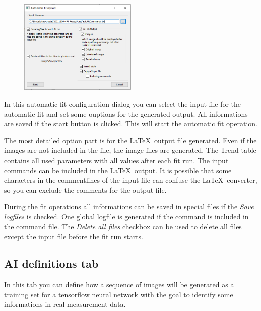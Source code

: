 \documentclass[11pt]{article} %
\begin{document}
\begin{figure}
  \begin{center}
    \includegraphics[width=0.5\textwidth]{auto-fit-options.png}
  \end{center}
\end{figure}
In this automatic fit configuration dialog you can select the input file for the automatic fit and set some ouptions for the generated output. All informations are saved if the start button is clicked. This will start the automatic fit operation.

The most detailed option part is for the \LaTeX\  output file generated. Even if the images are not included in the file, the image files are generated. The Trend table contains all used parameters with all values after each fit run. The input commands can be included in the \LaTeX\  output. It is possible that some characters in the commentlines of the input file can confuse the \LaTeX\ converter, so you can exclude the comments for the output file.

During the fit operations all informations can be saved in special files if the {\it Save logfiles} is checked. One global logfile is generated if the command is included in the command file. The {\it Delete all files} checkbox can be used to delete all files except the input file before the fit run starts.


\clearpage
\subsection{AI definitions tab}

In this tab you can define how a sequence of images will be generated as a training set for a tensorflow neural network with the goal to identify some informations in real measurement data.
\end{document}
